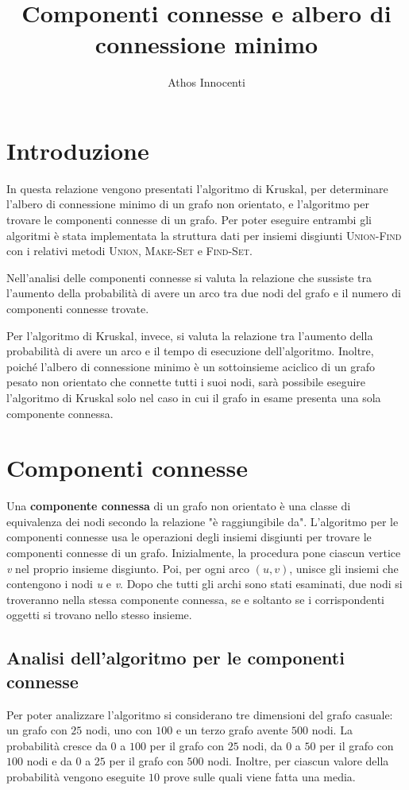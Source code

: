 \documentclass[11pt]{article}
\begin{document}
\title{\Large Componenti connesse e albero di connessione minimo}\date{}
\author{Athos Innocenti}
\maketitle
\section{Introduzione}
In questa relazione vengono presentati l'algoritmo di Kruskal, per determinare l'albero di connessione minimo di un grafo non orientato, e l'algoritmo per trovare le componenti connesse di un grafo. Per poter eseguire entrambi gli algoritmi è stata implementata la struttura dati per insiemi disgiunti \textsc{Union-Find} con i relativi metodi \textsc{Union}, \textsc{Make-Set} e \textsc{Find-Set}.

Nell'analisi delle componenti connesse si valuta la relazione che sussiste tra l'aumento della probabilità di avere un arco tra due nodi del grafo e il numero di componenti connesse trovate.

Per l'algoritmo di Kruskal, invece, si valuta la relazione tra l'aumento della probabilità di avere un arco e il tempo di esecuzione dell'algoritmo. Inoltre, poiché l'albero di connessione minimo è un sottoinsieme aciclico di un grafo pesato non orientato che connette tutti i suoi nodi, sarà possibile eseguire l'algoritmo di Kruskal solo nel caso in cui il grafo in esame presenta una sola componente connessa. 
\section{Componenti connesse}
Una \textbf{componente connessa} di un grafo non orientato è una classe di equivalenza dei nodi secondo la relazione "è raggiungibile da". L'algoritmo per le componenti connesse usa le operazioni degli insiemi disgiunti per trovare le componenti connesse di un grafo. Inizialmente, la procedura pone ciascun vertice \textit{v} nel proprio insieme disgiunto. Poi, per ogni arco $(u,v)$, unisce gli insiemi che contengono i nodi \textit{u} e \textit{v}. Dopo che tutti gli archi sono stati esaminati, due nodi si troveranno nella stessa componente connessa, se e soltanto se i corrispondenti oggetti si trovano nello stesso insieme.
\subsection{Analisi dell'algoritmo per le componenti connesse}
Per poter analizzare l'algoritmo si considerano tre dimensioni del grafo casuale: un grafo con $25$ nodi, uno con $100$ e un terzo grafo avente $500$ nodi. La probabilità cresce da $0$ a $100$ per il grafo con $25$ nodi, da $0$ a $50$ per il grafo con $100$ nodi e da $0$ a $25$ per il grafo con $500$ nodi. Inoltre, per ciascun valore della probabilità vengono eseguite $10$ prove sulle quali viene fatta una media.
\end{document}
